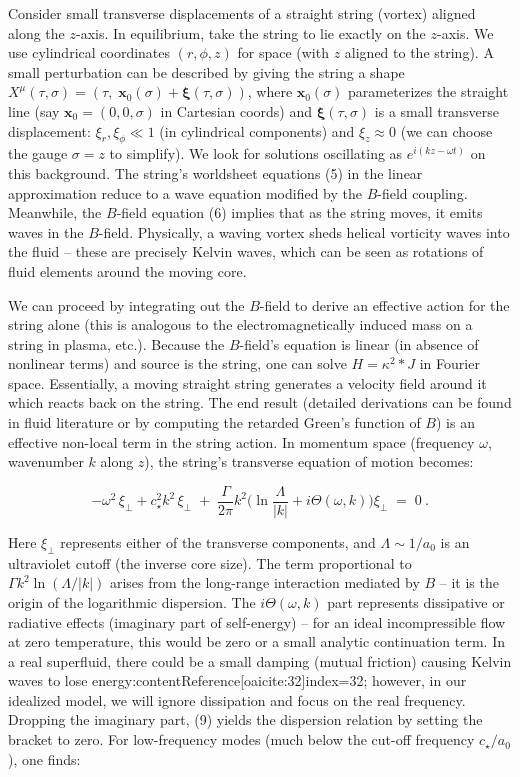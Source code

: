 \documentclass[12pt]{article}
\begin{document}
Consider small transverse displacements of a straight string (vortex) aligned along the $z$-axis. In equilibrium, take the string to lie exactly on the $z$-axis. We use cylindrical coordinates $(r,\phi,z)$ for space (with $z$ aligned to the string). A small perturbation can be described by giving the string a shape $X^\mu(\tau,\sigma) = (\tau, \; \mathbf{x}_0(\sigma) + \mathbf{\xi}(\tau,\sigma))$, where $\mathbf{x}_0(\sigma)$ parameterizes the straight line (say $\mathbf{x}_0 = (0,0,\sigma)$ in Cartesian coords) and $\mathbf{\xi}(\tau,\sigma)$ is a small transverse displacement: $\xi_r, \xi_\phi \ll 1$ (in cylindrical components) and $\xi_z \approx 0$ (we can choose the gauge $\sigma = z$ to simplify). We look for solutions oscillating as $e^{i(kz - \omega t)}$ on this background. The string’s worldsheet equations (5) in the linear approximation reduce to a wave equation modified by the $B$-field coupling. Meanwhile, the $B$-field equation (6) implies that as the string moves, it emits waves in the $B$-field. Physically, a waving vortex sheds helical vorticity waves into the fluid – these are precisely Kelvin waves, which can be seen as rotations of fluid elements around the moving core.

We can proceed by integrating out the $B$-field to derive an effective action for the string alone (this is analogous to the electromagnetically induced mass on a string in plasma, etc.). Because the $B$-field’s equation is linear (in absence of nonlinear terms) and source is the string, one can solve $H = \kappa^2 *J$ in Fourier space. Essentially, a moving straight string generates a velocity field around it which reacts back on the string. The end result (detailed derivations can be found in fluid literature or by computing the retarded Green’s function of $B$) is an effective non-local term in the string action. In momentum space (frequency $\omega$, wavenumber $k$ along $z$), the string’s transverse equation of motion becomes: 

\[ -\omega^2 \,\xi_\perp + c_\star^2 k^2\, \xi_\perp \;+\; \frac{\Gamma}{2\pi} k^2 \Big(\ln\frac{\Lambda}{|k|} + i\Theta(\omega,k)\Big)\xi_\perp \;=\;0~. \tag{9}\]

Here $\xi_\perp$ represents either of the transverse components, and $\Lambda\sim 1/a_0$ is an ultraviolet cutoff (the inverse core size). The term proportional to $\Gamma k^2 \ln(\Lambda/|k|)$ arises from the long-range interaction mediated by $B$ – it is the origin of the logarithmic dispersion. The $i\Theta(\omega,k)$ part represents dissipative or radiative effects (imaginary part of self-energy) – for an ideal incompressible flow at zero temperature, this would be zero or a small analytic continuation term. In a real superfluid, there could be a small damping (mutual friction) causing Kelvin waves to lose energy:contentReference[oaicite:32]{index=32}; however, in our idealized model, we will ignore dissipation and focus on the real frequency. Dropping the imaginary part, (9) yields the dispersion relation by setting the bracket to zero. For low-frequency modes (much below the cut-off frequency $c_\star/a_0$), one finds:
\end{document}
